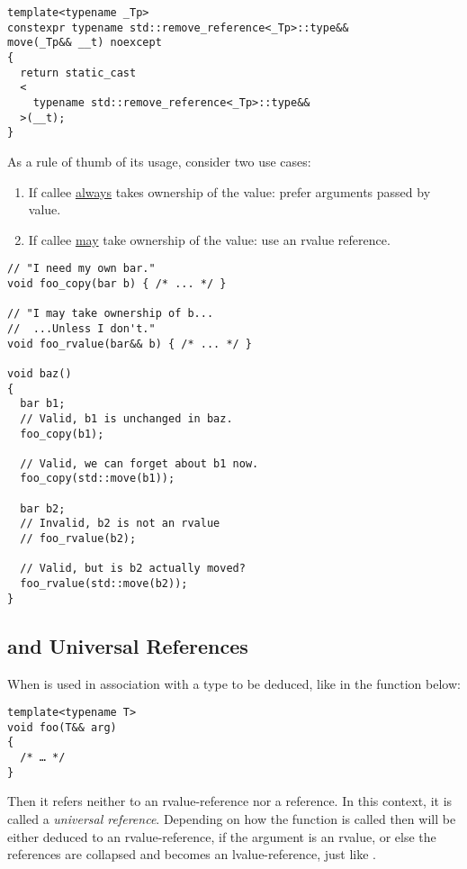 \begin{lstlisting}
template<typename _Tp>
constexpr typename std::remove_reference<_Tp>::type&&
move(_Tp&& __t) noexcept
{
  return static_cast
  <
    typename std::remove_reference<_Tp>::type&&
  >(__t);
}
\end{lstlisting}

\begin{guideline}
  As a rule of thumb of its usage, consider two use cases:

  \begin{enumerate}
  \item If callee \underline{always} takes ownership of the value:
    prefer arguments passed by value.
  \item If callee \underline{may} take ownership of the value: use an
    rvalue reference.
  \end{enumerate}
\end{guideline}

\begin{lstlisting}
// "I need my own bar."
void foo_copy(bar b) { /* ... */ }

// "I may take ownership of b...
//  ...Unless I don't."
void foo_rvalue(bar&& b) { /* ... */ }

void baz()
{
  bar b1;
  // Valid, b1 is unchanged in baz.
  foo_copy(b1);

  // Valid, we can forget about b1 now.
  foo_copy(std::move(b1));

  bar b2;
  // Invalid, b2 is not an rvalue
  // foo_rvalue(b2);

  // Valid, but is b2 actually moved?
  foo_rvalue(std::move(b2));
}
\end{lstlisting}

\subsection{ and Universal References}

When \code{\&\&} is used in association with a type to be deduced,
like in the function below:

\begin{lstlisting}
template<typename T>
void foo(T&& arg)
{
  /* … */
}
\end{lstlisting}

Then it refers neither to an rvalue-reference nor a reference. In this
context, it is called a \emph{universal reference}. Depending on how
the function is called then  will be either deduced to an
rvalue-reference, if the argument is an rvalue, or else the references
are collapsed and  becomes an lvalue-reference, just like
.

